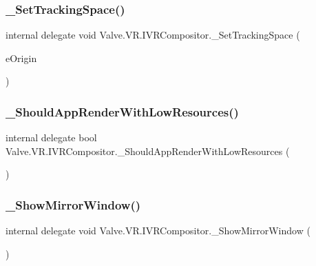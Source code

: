 \subsubsection{\texorpdfstring{\_SetTrackingSpace()}{\_SetTrackingSpace()}}
{\footnotesize\ttfamily internal delegate void Valve.\+V\+R.\+I\+V\+R\+Compositor.\+\_\+\+Set\+Tracking\+Space (\begin{DoxyParamCaption}\item[{\mbox{\hyperlink{namespace_valve_1_1_v_r_a29be99a3c2f780157bd490db06a7f12f}{E\+Tracking\+Universe\+Origin}}}]{e\+Origin }\end{DoxyParamCaption})}

\mbox{\label{struct_valve_1_1_v_r_1_1_i_v_r_compositor_aa6f4f906ffd776b1d99a73db6224e3dd}} 
\subsubsection{\texorpdfstring{\_ShouldAppRenderWithLowResources()}{\_ShouldAppRenderWithLowResources()}}
{\footnotesize\ttfamily internal delegate bool Valve.\+V\+R.\+I\+V\+R\+Compositor.\+\_\+\+Should\+App\+Render\+With\+Low\+Resources (\begin{DoxyParamCaption}{ }\end{DoxyParamCaption})}

\mbox{\label{struct_valve_1_1_v_r_1_1_i_v_r_compositor_a752ed27fd9773cc53b3be5e0d7cd2556}} 
\subsubsection{\texorpdfstring{\_ShowMirrorWindow()}{\_ShowMirrorWindow()}}
{\footnotesize\ttfamily internal delegate void Valve.\+V\+R.\+I\+V\+R\+Compositor.\+\_\+\+Show\+Mirror\+Window (\begin{DoxyParamCaption}{ }\end{DoxyParamCaption})}

\mbox{\label{struct_valve_1_1_v_r_1_1_i_v_r_compositor_a1422994a772786e464dde9703ca9bd7f}} 
